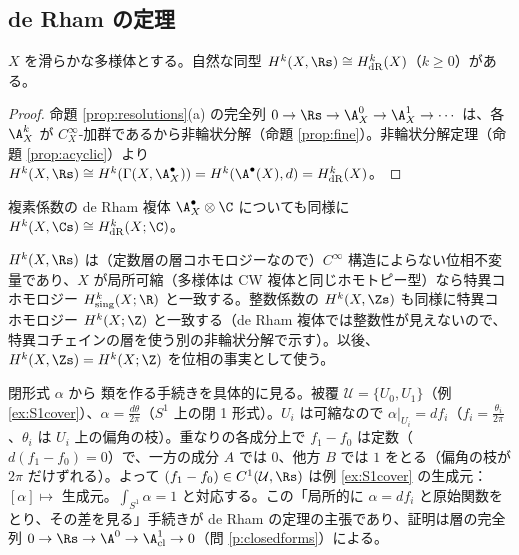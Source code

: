 \subsection{de Rham の定理}
\begin{thm}[de Rham]\label{thm:deRham}\tP
$X$ を滑らかな多様体とする。自然な同型 $H^k(X,\Rs)\cong H^k_{\mathrm{dR}}(X)$（$k\ge0$）がある。
\end{thm}
\begin{proof}
命題 \ref{prop:resolutions}(a) の完全列 $0\to\Rs\to\A^0_X\to\A^1_X\to\cdots$ は、各 $\A^k_X$ が $C^\infty_X$-加群であるから非輪状分解（命題 \ref{prop:fine}）。非輪状分解定理（命題 \ref{prop:acyclic}）より $H^k(X,\Rs)\cong H^k(\Gamma(X,\A^\bullet_X))=H^k(\A^\bullet(X),d)=H^k_{\mathrm{dR}}(X)$。\qedhere
\end{proof}
複素係数の de Rham 複体 $\A^\bullet_X\otimes\C$ についても同様に $H^k(X,\Cs)\cong H^k_{\mathrm{dR}}(X;\C)$。
\begin{rem}[位相的な不変性と整数係数]\tC
$H^k(X,\Rs)$ は（定数層の層コホモロジーなので）$C^\infty$ 構造によらない位相不変量であり、$X$ が局所可縮（多様体は CW 複体と同じホモトピー型）なら特異コホモロジー $H^k_{\mathrm{sing}}(X;\R)$ と一致する。整数係数の $H^k(X,\Zs)$ も同様に特異コホモロジー $H^k(X;\Z)$ と一致する（de Rham 複体では整数性が見えないので、特異コチェインの層を使う別の非輪状分解で示す）。以後、$H^k(X,\Zs)=H^k(X;\Z)$ を位相の事実として使う。
\end{rem}
\begin{ex}\label{ex:CechdR}
閉形式 $\alpha$ から \Cech{} 類を作る手続きを具体的に見る。被覆 $\mathcal U=\{U_0,U_1\}$（例 \ref{ex:S1cover}）、$\alpha=\frac{d\theta}{2\pi}$（$S^1$ 上の閉 1 形式）。$U_i$ は可縮なので $\alpha|_{U_i}=df_i$（$f_i=\frac{\theta_i}{2\pi}$、$\theta_i$ は $U_i$ 上の偏角の枝）。重なりの各成分上で $f_1-f_0$ は定数（$d(f_1-f_0)=0$）で、一方の成分 $A$ では $0$、他方 $B$ では $1$ をとる（偏角の枝が $2\pi$ だけずれる）。よって $(f_1-f_0)\in C^1(\mathcal U,\Rs)$ は例 \ref{ex:S1cover} の生成元：$[\alpha]\mapsto$ 生成元。$\int_{S^1}\alpha=1$ と対応する。この「局所的に $\alpha=df_i$ と原始関数をとり、その差を見る」手続きが de Rham の定理の主張であり、証明は層の完全列 $0\to\Rs\to\A^0\to\A^1_{\mathrm{cl}}\to0$（問 \ref{p:closedforms}）による。
\end{ex}

